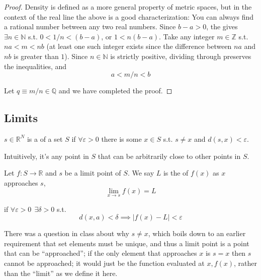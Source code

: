 \documentclass{article}
\begin{document}
\begin{proof}
  Density is defined as a more general property of metric spaces, but in the context of the real line the above is a good characterization: You can always find a rational number between any two real numbers.  Since $b - a > 0$, the  gives $\exists n \in \mathbb{N}$ s.t. $0 < 1/n < (b - a)$, or $1 < n(b - a)$. Take any integer $m \in \mathbb{Z}$ s.t. $na < m < nb$ (at least one such integer exists since the difference between $na$ and $nb$ is greater than $1$). Since $n \in \mathbb{N}$ is strictly positive, dividing  through preserves the inequalities, and
  \[
    a < m/n < b
  \]

  Let $q \equiv m/n \in \mathbb{Q}$ and we have completed the proof.
\end{proof}

\subsection{Limits}
\label{sub:limits}

\begin{definition}
  $s \in \mathbb{R}^N$ is a  of a set $S$ if $\forall \varepsilon > 0$ there is some $x \in S$ s.t. $s \ne x$ and $d(s, x) < \varepsilon$.
\end{definition}

Intuitively, it's any point in $S$ that can be arbitrarily close to other points in $S$.
\begin{definition}
  Let $f: S \to \mathbb{R}$ and $s$ be a limit point of $S$. We say $L$ is the  of $f(x)$ as $x$ approaches $s$,
  \[
    \lim_{x \to s} f(x) = L
  \]

  if $\forall \varepsilon > 0 ~~ \exists \delta > 0$ s.t.
  \[
    d(x, a) < \delta \implies |f(x) - L| < \varepsilon
  \]
\end{definition}

\begin{remark}
  There was a question in class about why $s \ne x$, which boils down to an earlier requirement that set elements must be unique, and thus a limit point is a point that can be ``approached''; if the only element that approaches $x$ is $s = x$ then $s$ cannot be approached; it would just be the function evaluated at $x, f(x)$, rather than the ``limit'' as we define it here.
\end{remark}
\end{document}
